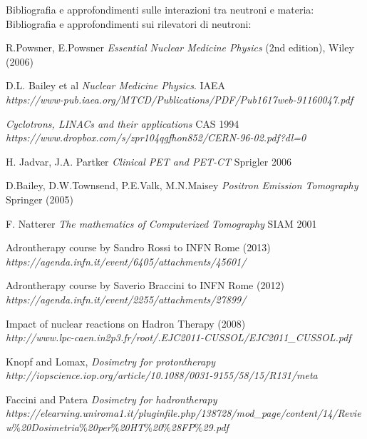 \documentclass [a4paper, twoside] {book}
\begin{document}
Bibliografia e approfondimenti sulle interazioni tra neutroni e materia: \cite{Corvisiero} \cite{Assay}\\

Bibliografia e approfondimenti sui rilevatori di neutroni: \cite{Beringer2} \cite{Knoll}

\begin{thebibliography}{35}


R.Powsner, E.Powsner 
\textit{Essential Nuclear Medicine Physics}
 (2nd edition), Wiley (2006)

D.L. Bailey et al
\textit{Nuclear Medicine Physics}.
IAEA\\
 \textit{https://www-pub.iaea.org/MTCD/Publications/PDF/Pub1617web-91160047.pdf}

\textit{Cyclotrons, LINACs and their applications}
CAS 1994\\ \textit{https://www.dropbox.com/s/zpr104qgfhon852/CERN-96-02.pdf?dl=0}

H. Jadvar, J.A. Partker
\textit{Clinical PET and PET-CT}
Sprigler 2006

D.Bailey, D.W.Townsend, P.E.Valk, M.N.Maisey
\textit{Positron Emission Tomography}
Springer (2005)

F. Natterer
\textit{The mathematics of Computerized Tomography}
SIAM 2001

Adrontherapy course by Sandro Rossi to INFN Rome (2013)
\\ \textit{https://agenda.infn.it/event/6405/attachments/45601/}

Adrontherapy course by Saverio Braccini to INFN Rome (2012)
\\ \textit{https://agenda.infn.it/event/2255/attachments/27899/}

Impact of nuclear reactions on Hadron Therapy (2008)
\\ \textit{http://www.lpc-caen.in2p3.fr/root/.EJC2011-CUSSOL/EJC2011\_CUSSOL.pdf}

Knopf and Lomax,
\textit{Dosimetry for protontherapy}
\\ \textit{http://iopscience.iop.org/article/10.1088/0031-9155/58/15/R131/meta}

Faccini and Patera
\textit{Dosimetry for hadrontherapy}
\\ \textit{https://elearning.uniroma1.it/pluginfile.php/138728/mod\_page/content/14/Review$\%$20Dosimetria$\%$20per$\%$20HT$\%$20$\%$28FP$\%$29.pdf}


\end{thebibliography}
\end{document}
